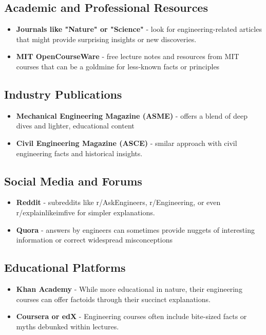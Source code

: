 \documentclass[11pt,letterpaper]{article}
\begin{document}
\subsection*{Academic and Professional Resources}
\begin{itemize}
	\item \textbf{Journals like "Nature" or "Science"} - look for engineering-related articles that might provide surprising insights or new discoveries.
	\item \textbf{MIT OpenCourseWare} - free lecture notes and resources from MIT courses that can be a goldmine for less-known facts or principles
	
\end{itemize}


\subsection*{Industry Publications}
\begin{itemize}
	\item  \textbf{Mechanical Engineering Magazine (ASME)} - offers a blend of deep dives and lighter, educational content
	\item \textbf{Civil Engineering Magazine (ASCE)} - smilar approach with civil engineering facts and historical insights.
\end{itemize}

\subsection*{Social Media and Forums}
\begin{itemize}
	\item \textbf{Reddit} - subreddits like r/AskEngineers, r/Engineering, or even r/explainlikeimfive for simpler explanations.
	\item \textbf{Quora} - answers by engineers can sometimes provide nuggets of interesting information or correct widespread misconceptions
\end{itemize}


\subsection*{Educational Platforms} 
\begin{itemize}
\item \textbf{Khan Academy} - While more educational in nature, their engineering courses can offer factoids through their succinct explanations.
\item \textbf{Coursera or edX} - Engineering courses often include bite-sized facts or myths debunked within lectures.
\end{itemize}
\end{document}
